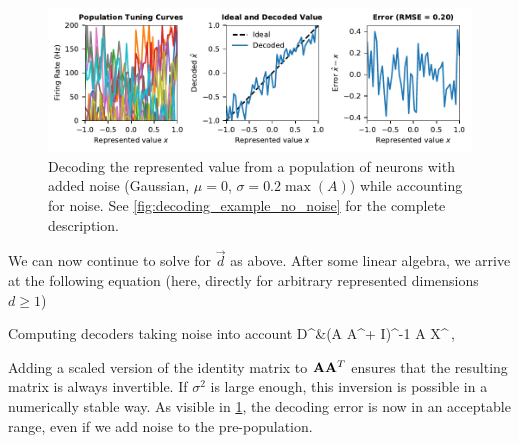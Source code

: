 \documentclass[10pt,letterpaper,oneside]{article}
\begin{document}
\begin{figure}
	\centering
	\includegraphics{media/decoding_example_noise_accounted.pdf}
	\caption{Decoding the represented value from a population of neurons with added noise (Gaussian, $\mu = 0$, $\sigma = 0.2 \max(A)$) while accounting for noise. See \cref{fig:decoding_example_no_noise} for the complete description. }
	\label{fig:decoding_example_noise_accounted}
\end{figure}

We can now continue to solve for $\vec{d}$ as above. After some linear algebra, we arrive at the following equation (here, directly for arbitrary represented dimensions $d \geq 1$)
\begin{ImportantEqn}{Computing decoders taking noise into account}
	\mat D^\T &\approx  \left(\mat A \mat A^\T +  \mat I\right)^{-1} \mat A \mat X^\T \,, 
	\label{eqn:decoders_noise}
\end{ImportantEqn}
Adding a scaled version of the identity matrix to ${\mathbf{A}} {\mathbf{A}}^T$ ensures that the resulting matrix is always invertible. If $\sigma^2$ is large enough, this inversion is possible in a numerically stable way. As visible in \cref{fig:decoding_example_noise_accounted}, the decoding error is now in an acceptable range, even if we add noise to the pre-population.

\cprotect{}
\end{document}
